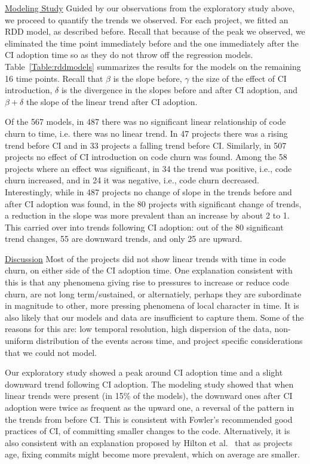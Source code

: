 \noindent \underline{Modeling Study} 
Guided by our observations from the exploratory study above, we proceed to 
quantify the trends we observed.
For each project, we fitted an RDD model, as described before.
Recall that because of the peak we observed, we eliminated the time point 
immediately before and the one immediately after the CI adoption time so as 
they do not throw off the regression models.
Table~\ref{Table:rddmodels} summarizes the results for the models on the 
remaining 16 time points.
Recall that $\beta$ is the slope before, $\gamma$ the size of the effect of 
CI introduction, $\delta$ is the divergence in the slopes before and after CI 
adoption, and $\beta + \delta$ the slope of the linear trend after CI adoption.

Of the 567 models, in 487  there was no significant linear relationship of code churn to time, i.e. there was no linear trend.
In 47 projects there was a rising trend before CI and in 33 projects a falling trend before CI.
Similarly, in 507 projects no effect of CI introduction on code churn was found. Among the 58 projects where an effect was significant, in 34 the trend was positive, i.e., code churn increased, and in 24 it was negative, i.e., code churn decreased.
Interestingly, while in 487 projects no change of slope in the trends before and after CI adoption was found, in the 80 projects with significant change of trends, a reduction in the slope was more prevalent than an increase by about 2 to 1.
This carried over into trends following CI adoption: out of the 80 significant trend changes, 55 are downward trends, and only 25 are upward.



\noindent \underline{Discussion}
Most of the projects did not show linear trends with time in code churn, on either side of the CI adoption time.
One explanation consistent with this is that any phenomena giving rise to pressures to increase or reduce code churn, are not long term/sustained, or alternatiely, perhaps they are subordinate in magnitude to other, more pressing phenomena of local character in time.  
It is also likely that our models and data are insufficient to capture them.
Some of the reasons for this are: low temporal resolution, high dispersion of the data,
non-uniform distribution of the events across time, and project specific considerations that we could not model.

Our exploratory study showed a peak around CI adoption time and a slight downward trend following CI adoption.
The modeling study showed that when linear trends were present (in 15\% of the models), the downward ones after CI adoption were twice  as frequent as the upward one, a reversal of the pattern in the trends from before CI.
This is consistent with Fowler's recommended good practices of CI, of committing smaller changes to the code.
Alternatively, it is also consistent with an explanation proposed by Hilton et al.~\cite{Hilton2016} that as projects age, fixing commits might become more prevalent, which on average are smaller.

